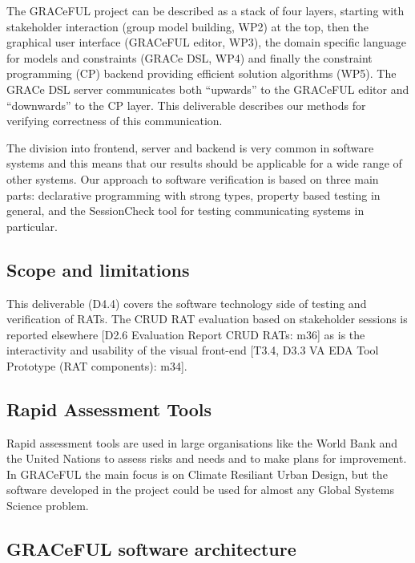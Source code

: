 The GRACeFUL project can be described as a stack of four layers,
starting with stakeholder interaction (group model building, WP2) at
the top, then the graphical user interface (GRACeFUL editor, WP3), the
domain specific language for models and constraints (GRACe DSL, WP4)
and finally the constraint programming (CP) backend providing
efficient solution algorithms (WP5).
%
The GRACe DSL server communicates both ``upwards'' to the GRACeFUL
editor and ``downwards'' to the CP layer.
%
This deliverable describes our methods for verifying correctness of
this communication.

The division into frontend, server and backend is very common in
software systems and this means that our results should be applicable
for a wide range of other systems.
%
Our approach to software verification is based on three main parts:
%
declarative programming with strong types, property based testing in
general, and the SessionCheck tool for testing communicating systems
in particular.

\subsection{Scope and limitations}

This deliverable (D4.4) covers the software technology side of testing
and verification of RATs.
%
The CRUD RAT evaluation based on stakeholder sessions is reported
elsewhere [D2.6 Evaluation Report CRUD RATs: m36] as is the
interactivity and usability of the visual front-end [T3.4, D3.3 VA EDA
Tool Prototype (RAT components): m34].

\subsection{Rapid Assessment Tools}

Rapid assessment tools are used in large organisations like the World
Bank and the United Nations to assess risks and needs and to make
plans for improvement.
In GRACeFUL the main focus is on Climate Resiliant Urban Design, but
the software developed in the project could be used for almost any
Global Systems Science problem.


\subsection{GRACeFUL software architecture}



